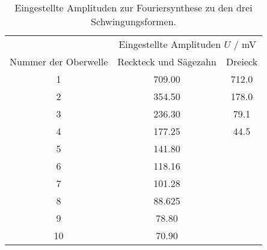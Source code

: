 \begin{table}[!htp]
\centering
\caption{Eingestellte Amplituden zur Fouriersynthese zu den drei Schwingungsformen.}
\label{tab:eingestellt}
\begin{tabular}{c c c}
\toprule
 & \multicolumn{2}{c}{Eingestellte Amplituden $U$ / mV } \\
 \cmidrule(lr){2-3}
{Nummer der Oberwelle} & {Reckteck und Sägezahn} & {Dreieck} \\
\midrule
1 & 709.00 & 712.0\\
2 & 354.50 & 178.0\\
3 & 236.30 & 79.1\\
4 & 177.25 & 44.5\\
5 & 141.80 & \\
6 & 118.16 & \\
7 & 101.28 & \\
8 & 88.625 & \\
9 & 78.80  & \\
10 & 70.90 & \\
\bottomrule
\end{tabular}
\end{table}